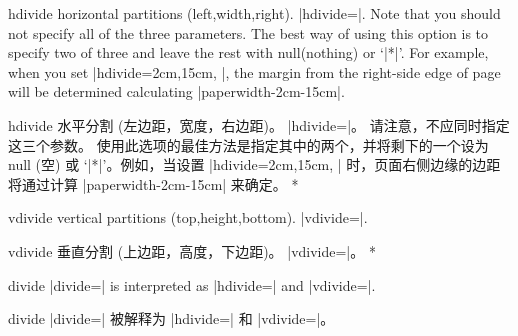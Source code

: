 \begin{Options}
\begin{paracol}{2}
\item[hdivide] horizontal partitions (left,width,right).
  |hdivide=|. 
  Note that you should not specify all of the three parameters.
  The best way of using this option is to specify two of three and 
  leave the rest with null(nothing) or `|*|'. For example, when you set
  |hdivide={2cm,15cm, }|, the margin from the right-side edge of page
  will be determined calculating |paperwidth-2cm-15cm|.
\switchcolumn
\item[hdivide] 水平分割 (左边距，宽度，右边距)。
|hdivide=|。
请注意，不应同时指定这三个参数。
使用此选项的最佳方法是指定其中的两个，并将剩下的一个设为 null (空) 或 `|*|'。例如，当设置 |hdivide={2cm,15cm, }| 时，页面右侧边缘的边距将通过计算 |paperwidth-2cm-15cm| 来确定。
\switchcolumn[0]*
\item[vdivide] vertical partitions (top,height,bottom).
|vdivide=|.
\switchcolumn
\item[vdivide] 垂直分割 (上边距，高度，下边距)。
|vdivide=|。
\switchcolumn[0]*
\item[divide] |divide=| is interpreted  as 
|hdivide=| and |vdivide=|.
\switchcolumn
\item[divide] |divide=| 被解释为 |hdivide=| 和 |vdivide=|。
\end{paracol}
\end{Options}
